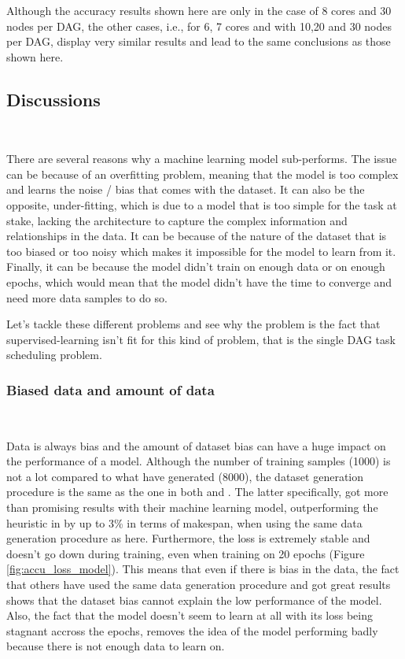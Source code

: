Although the accuracy results shown here are only 
in the case of 8 cores and 30 nodes per DAG,
the other cases, i.e., for 6, 7 cores and with 10,20 and 30 nodes per DAG,
display very similar results and lead to the same conclusions as those
shown here.

\subsection{Discussions}
~
\label{sec:discussion}

There are several reasons why a machine learning model
sub-performs.
The issue can be because of an overfitting problem,
meaning that the model is too complex and learns the noise / bias
that comes with the dataset.
It can also be the opposite, under-fitting, 
which is due to a model that is too simple for the task at stake,
lacking the architecture to capture the complex information and 
relationships
in the data.
It can be because of the nature of the dataset that is too biased
or too noisy which makes it impossible for the model to learn from it.
Finally, it can be because the model didn't train on enough data 
or on enough epochs, which would mean that the model didn't have
the time to converge and need more data samples to do so.

Let's tackle these different problems and see why 
the problem is the fact that supervised-learning isn't fit for this kind of problem,
that is the single DAG task scheduling problem.


\subsubsection{Biased data and amount of data}
~

Data is always bias and the amount of dataset bias\cite{torralba2011biasdataset}
can have a huge impact on the performance of a model.
Although the number of training samples (1000) is not a lot 
compared to what \citet{Lee2021GlobalDagSchedDRL} have generated (8000),
the dataset generation procedure is the same as the one 
in both \citet{zhao2020DAGsched} and \citet{Lee2021GlobalDagSchedDRL}.
The latter specifically, got more than promising results with their machine learning model,
outperforming the heuristic in \citet{zhao2020DAGsched} by up to 3\% in terms of makespan,
 when using the same data generation procedure as here.
Furthermore, the loss is extremely stable and doesn't go down
during training, even when training on 20 epochs (Figure \ref{fig:accu_loss_model}).
This means that even if there is bias in the data, the fact that others have used
the same data generation procedure and got great results shows that the
dataset bias cannot explain the low performance of the model.
Also, the fact that the model doesn't seem to learn at all with 
its loss being stagnant accross the epochs, removes the 
idea of the model performing badly because there is not enough data to learn on.


